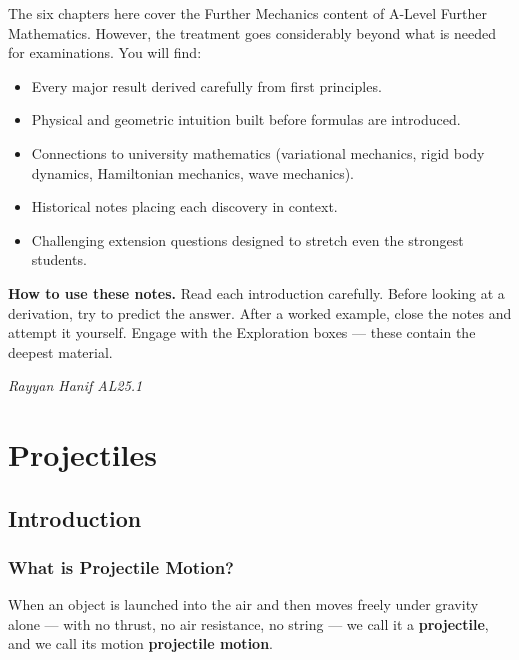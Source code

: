 \documentclass[12pt, a4paper]{book}
\begin{document}
The six chapters here cover the Further Mechanics content of A-Level Further Mathematics. However, the treatment goes considerably beyond what is needed for examinations. You will find:

\begin{itemize}[leftmargin=2em]
  \item Every major result derived carefully from first principles.
  \item Physical and geometric intuition built before formulas are introduced.
  \item Connections to university mathematics (variational mechanics, rigid body dynamics, Hamiltonian mechanics, wave mechanics).
  \item Historical notes placing each discovery in context.
  \item Challenging extension questions designed to stretch even the strongest students.
\end{itemize}

\noindent\textbf{How to use these notes.} Read each introduction carefully. Before looking at a derivation, try to predict the answer. After a worked example, close the notes and attempt it yourself. Engage with the Exploration boxes --- these contain the deepest material.

\vspace{1cm}
\noindent\textit{Rayyan Hanif AL25.1}

\tableofcontents

\mainmatter

\chapter{Projectiles}

\section{Introduction}

\subsection{What is Projectile Motion?}

When an object is launched into the air and then moves freely under gravity alone --- with no thrust, no air resistance, no string --- we call it a \textbf{projectile}, and we call its motion \textbf{projectile motion}.
\end{document}

